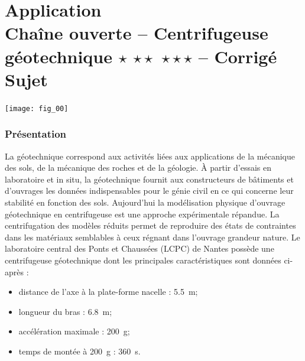 \chapter*{Application  \\ 
Chaîne ouverte -- Centrifugeuse géotechnique \ifnormal $\star$ \else \fi \ifdifficile $\star\star$ \else \fi \iftdifficile $\star\star\star$ \else \fi
-- \ifprof Corrigé \else Sujet \fi}

\iflivret {} \else
\ifprof  {} \else \fi
\fi

\setcounter{question}{0}
\begin{marginfigure}
\texttt{[image: fig\_00]}
\end{marginfigure}



\subsection*{Présentation}
La géotechnique correspond aux activités liées aux applications de la mécanique des sols, de la mécanique des roches et de la
géologie. À partir d'essais en laboratoire et in situ, la géotechnique fournit aux constructeurs de bâtiments et d'ouvrages les
données indispensables pour le génie civil en ce qui concerne leur stabilité en fonction des sols. Aujourd'hui la modélisation
physique d'ouvrage géotechnique en centrifugeuse est une approche expérimentale répandue. La centrifugation des modèles
réduits permet de reproduire des états de contraintes dans les matériaux semblables à ceux régnant dans l'ouvrage grandeur
nature. Le laboratoire central des Ponts et Chaussées (LCPC) de Nantes possède une centrifugeuse géotechnique dont les
principales caractéristiques sont données ci-après :
\begin{itemize}
\item distance de l'axe à la plate-forme nacelle : \SI{5,5}{m};
\item longueur du bras : \SI{6,8}{m};
\item accélération maximale : \SI{200}{g};
\item temps de montée à \SI{200}{g} : \SI{360}{s}.
\end{itemize}

